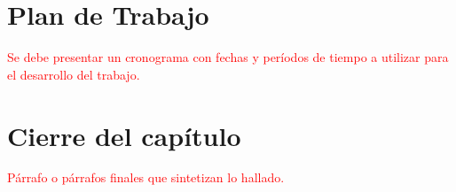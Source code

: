 \section{Plan de Trabajo} 
\textcolor{red}{Se debe presentar un cronograma con fechas y períodos de tiempo a utilizar para el desarrollo del 
trabajo.}

\section{Cierre del capítulo} 
\textcolor{red}{Párrafo o párrafos finales que sintetizan lo hallado.}
